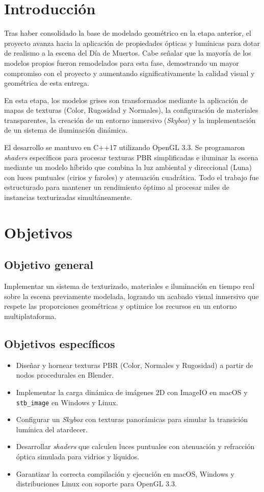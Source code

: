 \documentclass[letter,11pt]{article}
\begin{document}
	\tableofcontents
	
	\newpage
	
\section{Introducción}
	Tras haber consolidado la base de modelado geométrico en la etapa anterior, el proyecto avanza hacia la aplicación de propiedades ópticas y lumínicas para dotar de realismo a la escena del Día de Muertos. Cabe señalar que la mayoría de los modelos propios fueron remodelados para esta fase, demostrando un mayor compromiso con el proyecto y aumentando significativamente la calidad visual y geométrica de esta entrega.
	
	En esta etapa, los modelos grises son transformados mediante la aplicación de mapas de texturas (Color, Rugosidad y Normales), la configuración de materiales transparentes, la creación de un entorno inmersivo (\textit{Skybox}) y la implementación de un sistema de iluminación dinámica.
	
	El desarrollo se mantuvo en C++17 utilizando OpenGL 3.3. Se programaron \textit{shaders} específicos para procesar texturas PBR simplificadas e iluminar la escena mediante un modelo híbrido que combina la luz ambiental y direccional (Luna) con luces puntuales (cirios y faroles) y atenuación cuadrática. Todo el trabajo fue estructurado para mantener un rendimiento óptimo al procesar miles de instancias texturizadas simultáneamente.
	
	\section{Objetivos}
	\subsection{Objetivo general}
	Implementar un sistema de texturizado, materiales e iluminación en tiempo real sobre la escena previamente modelada, logrando un acabado visual inmersivo que respete las proporciones geométricas y optimice los recursos en un entorno multiplataforma.
	
	\subsection{Objetivos específicos}
	\begin{itemize}[leftmargin=*]
		\item Diseñar y hornear texturas PBR (Color, Normales y Rugosidad) a partir de nodos procedurales en Blender.
		\item Implementar la carga dinámica de imágenes 2D con ImageIO en macOS y \texttt{stb\_image} en Windows y Linux.
		\item Configurar un \textit{Skybox} con texturas panorámicas para simular la transición lumínica del atardecer.
		\item Desarrollar \textit{shaders} que calculen luces puntuales con atenuación y refracción óptica simulada para vidrios y líquidos.
		\item Garantizar la correcta compilación y ejecución en macOS, Windows y distribuciones Linux con soporte para OpenGL 3.3.
	\end{itemize}
	
\end{document}
